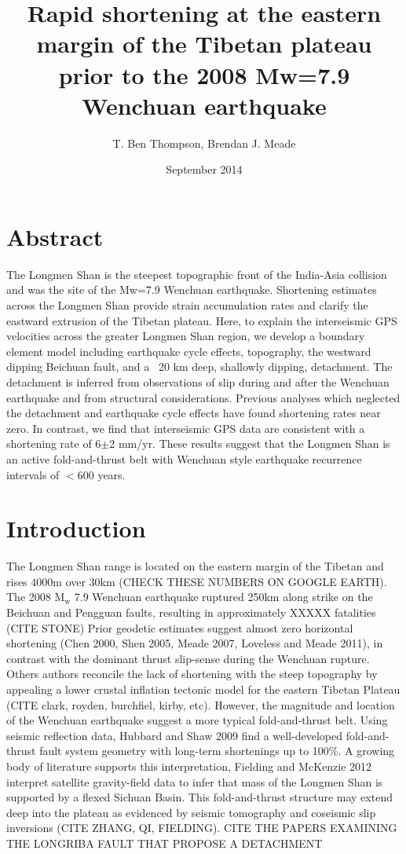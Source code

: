 \documentclass{article}
\title{Rapid shortening at the eastern margin of the Tibetan plateau prior to the 2008 Mw=7.9 Wenchuan earthquake}
\author{T. Ben Thompson, Brendan J. Meade}
\date{September 2014}
\begin{document}
\maketitle

\section{Abstract}
The Longmen Shan is the steepest topographic front of the India-Asia collision and was the site of the Mw=7.9 Wenchuan earthquake.
Shortening estimates across the Longmen Shan provide strain accumulation rates and clarify the eastward extrusion of the Tibetan plateau.
Here, to explain the interseismic GPS velocities across the greater Longmen Shan region, we develop a boundary element model including earthquake cycle effects, topography, the westward dipping Beichuan fault, and a ~20 km deep, shallowly dipping, detachment.
The detachment is inferred from observations of slip during and after the Wenchuan earthquake and from structural considerations.
Previous analyses which neglected the detachment and earthquake cycle effects have found shortening rates near zero.
In contrast, we find that interseismic GPS data are consistent with a shortening rate of 6$\pm$2 mm/yr.
These results suggest that the Longmen Shan is an active fold-and-thrust belt with Wenchuan style earthquake recurrence intervals of $<$600 years.

\section{Introduction}
The Longmen Shan range is located on the eastern margin of the Tibetan and rises 4000m over 30km (CHECK THESE NUMBERS ON GOOGLE EARTH).
The 2008 $\mathrm{M_w}$ 7.9 Wenchuan earthquake ruptured 250km along strike on the Beichuan and Pengguan faults, resulting in approximately XXXXX fatalities (CITE STONE)
Prior geodetic estimates suggest almost zero horizontal shortening (Chen 2000, Shen 2005, Meade 2007, Loveless and Meade 2011), in contrast with the dominant thrust slip-sense during the Wenchuan rupture. 
Others authors reconcile the lack of shortening with the steep topography by appealing a lower crustal inflation tectonic model for the eastern Tibetan Plateau (CITE clark, royden, burchfiel, kirby, etc).
However, the magnitude and location of the Wenchuan earthquake suggest a more typical fold-and-thrust belt. 
Using seismic reflection data, Hubbard and Shaw 2009 find a well-developed fold-and-thrust fault system geometry with long-term shortenings up to 100\%. 
A growing body of literature supports this interpretation, 
Fielding and McKenzie 2012 interpret satellite gravity-field data to infer that mass of the Longmen Shan is supported by a flexed Sichuan Basin. 
This fold-and-thrust structure may extend deep into the plateau as evidenced by seismic tomography and coseismic slip inversions (CITE ZHANG, QI, FIELDING). 
CITE THE PAPERS EXAMINING THE LONGRIBA FAULT THAT PROPOSE A DETACHMENT
\end{document}
